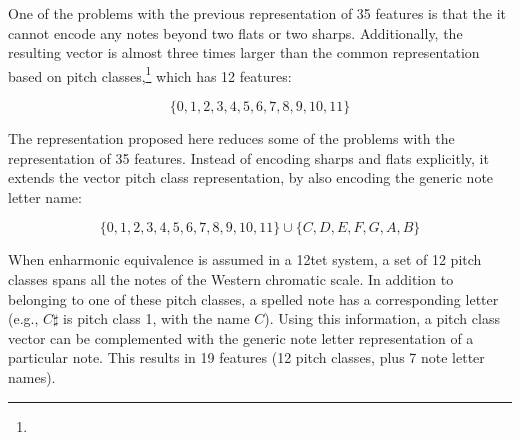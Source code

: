 
One of the problems with the previous representation of 35
features is that the it cannot encode any notes beyond two
flats or two sharps. Additionally, the resulting vector is
almost three times larger than the common representation
based on pitch classes,\footnote{} which has 12 features:

\begin{equation}
    \{0, 1, 2, 3, 4, 5, 6, 7, 8, 9, 10, 11\}
\end{equation}

The representation proposed here reduces some of the
problems with the representation of 35 features. Instead of
encoding sharps and flats explicitly, it extends the vector
pitch class representation, by also encoding the generic
note letter name:

\begin{equation}
    \{0, 1, 2, 3, 4, 5, 6, 7, 8, 9, 10, 11\} \cup \{C, D, E, F, G, A, B\}
\end{equation}

When enharmonic equivalence is assumed in a \gls{12tet}
system, a set of 12 pitch classes spans all the notes of the
Western chromatic scale. In addition to belonging to one of
these pitch classes, a spelled note has a corresponding
letter (e.g., $C\sharp$ is pitch class 1, with the name
$C$). Using this information, a pitch class vector can be
complemented with the generic note letter representation of
a particular note. This results in 19 features (12 pitch
classes, plus 7 note letter names).
